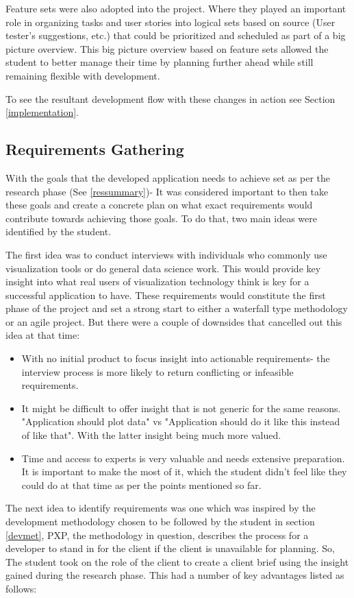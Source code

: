 Feature sets were also adopted into the project. Where they played an important role in organizing tasks and user stories into logical sets based on source (User tester's suggestions, etc.) that could be prioritized and scheduled as part of a big picture overview. This big picture overview based on feature sets allowed the student to better manage their time by planning further ahead while still remaining flexible with development.

To see the resultant development flow with these changes in action see Section \ref{implementation}.

\subsection{Requirements Gathering} \label{reqgat}
With the goals that the developed application needs to achieve set as per the research phase (See \ref{ressummary})- It was considered important to then take these goals and create a concrete plan on what exact requirements would contribute towards achieving those goals. To do that, two main ideas were identified by the student.

The first idea was to conduct interviews with individuals who commonly use visualization tools or do general data science work. This would provide key insight into what real users of visualization technology think is key for a successful application to have. These requirements would constitute the first phase of the project and set a strong start to either a waterfall type methodology or an agile project.
But there were a couple of downsides that cancelled out this idea at that time:
\begin{itemize}
    \item With no initial product to focus insight into actionable requirements- the interview process is more likely to return conflicting or infeasible requirements.
    \item It might be difficult to offer insight that is not generic for the same reasons. "Application should plot data" vs "Application should do it like this instead of like that". With the latter insight being much more valued.
    \item Time and access to experts is very valuable and needs extensive preparation. It is important to make the most of it, which the student didn’t feel like they could do at that time as per the points mentioned so far.
\end{itemize}

The next idea to identify requirements was one which was inspired by the development methodology chosen to be followed by the student in section \ref{devmet}, PXP, the methodology in question, describes the process for a developer to stand in for the client if the client is unavailable for planning. So, The student took on the role of the client to create a client brief using the insight gained during the research phase. This had a number of key advantages listed as follows:

